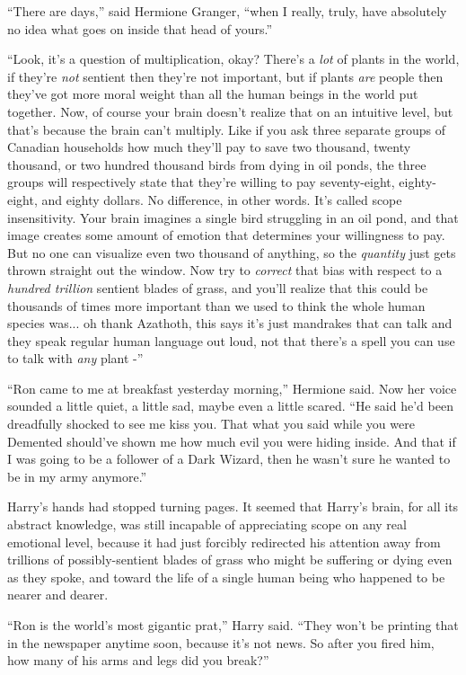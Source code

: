 ``There are days,'' said Hermione Granger, ``when I really, truly, have
absolutely no idea what goes on inside that head of yours.''

``Look, it's a question of multiplication, okay? There's a \emph{lot} of
plants in the world, if they're \emph{not} sentient then they're not
important, but if plants \emph{are} people then they've got more moral
weight than all the human beings in the world put together. Now, of
course your brain doesn't realize that on an intuitive level, but that's
because the brain can't multiply. Like if you ask three separate groups
of Canadian households how much they'll pay to save two thousand, twenty
thousand, or two hundred thousand birds from dying in oil ponds, the
three groups will respectively state that they're willing to pay
seventy-eight, eighty-eight, and eighty dollars. No difference, in other
words. It's called scope insensitivity. Your brain imagines a single
bird struggling in an oil pond, and that image creates some amount of
emotion that determines your willingness to pay. But no one can
visualize even two thousand of anything, so the \emph{quantity} just
gets thrown straight out the window. Now try to \emph{correct} that bias
with respect to a \emph{hundred trillion} sentient blades of grass, and
you'll realize that this could be thousands of times more important than
we used to think the whole human species was... oh thank Azathoth,
this says it's just mandrakes that can talk and they speak regular human
language out loud, not that there's a spell you can use to talk with
\emph{any} plant -''

``Ron came to me at breakfast yesterday morning,'' Hermione said. Now
her voice sounded a little quiet, a little sad, maybe even a little
scared. ``He said he'd been dreadfully shocked to see me kiss you. That
what you said while you were Demented should've shown me how much evil
you were hiding inside. And that if I was going to be a follower of a
Dark Wizard, then he wasn't sure he wanted to be in my army anymore.''

Harry's hands had stopped turning pages. It seemed that Harry's brain,
for all its abstract knowledge, was still incapable of appreciating
scope on any real emotional level, because it had just forcibly
redirected his attention away from trillions of possibly-sentient blades
of grass who might be suffering or dying even as they spoke, and toward
the life of a single human being who happened to be nearer and dearer.

``Ron is the world's most gigantic prat,'' Harry said. ``They won't be
printing that in the newspaper anytime soon, because it's not news. So
after you fired him, how many of his arms and legs did you break?''

